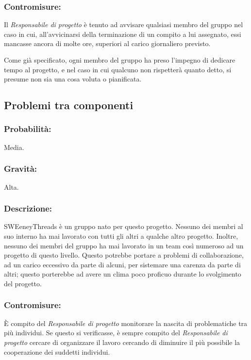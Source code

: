 \documentclass[a4paper]{report}
\begin{document}
				\subsubsection{Contromisure:}
					Il \emph{Responsabile di progetto} è tenuto ad avvisare qualsiasi membro del gruppo 
					nel caso in cui, all'avvicinarsi della terminazione di un compito a lui assegnato, 
					essi mancasse ancora di molte ore, superiori al carico giornaliero previsto. 
					
					Come già specificato, ogni membro del gruppo ha preso l'impegno di dedicare tempo 
					al progetto, e nel caso in cui qualcuno non rispetterà quanto detto, si presume 
					non sia una cosa voluta o pianificata.
			\subsection{Problemi tra componenti}
				\subsubsection{Probabilità:}
					Media.
				\subsubsection{Gravità:}
					Alta.
				\subsubsection{Descrizione:}
					SWEeneyThreads è un gruppo nato per questo progetto. Nessuno dei membri al suo interno 
					ha mai lavorato con tutti gli altri a qualche altro progetto. Inoltre, nessuno dei membri 
					del gruppo ha mai lavorato in un team così numeroso ad un progetto di questo livello. 
					Questo potrebbe portare a problemi di collaborazione, ad un carico eccessivo da parte di 
					alcuni, per sistemare una carenza da parte di altri; questo porterebbe ad avere un clima 
					poco proficuo durante lo svolgimento del progetto.
				\subsubsection{Contromisure:}
					È compito del \emph{Responsabile di progetto} monitorare la nascita di problematiche tra più 
					individui. Se questo si verificasse, è sempre compito del \emph{Responsabile di progetto} 
					cercare di organizzare il lavoro cercando di diminuire il più possibile la cooperazione 
					dei suddetti individui. 
					
\end{document}
